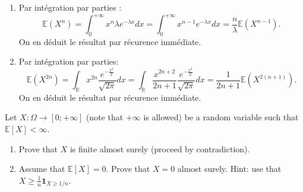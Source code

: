 \begin{solution}
  \begin{enumerate}
    \item Par int\'{e}gration par parties :
          \[
            \mathbb{E}\left(X^{n}\right) = \int_{0}^{+\infty}x^{n}\lambda e^{-\lambda x}dx = \int_{0}^{+\infty}x^{n-1} e^{-\lambda x}dx = \frac{n}{\lambda}\mathbb{E}\left(X^{n-1}\right).
          \]
          On en d\'{e}duit le r\'{e}sultat par r\'{e}curence imm\'{e}diate.
    \item Par int\'{e}gration par parties:
          \[
            \mathbb{E}\left(X^{2n}\right) = \int_{\mathbb{R}}x^{2n}\frac{e^{-\frac{x^2}{2}}}{\sqrt{2\pi}}dx = \int_{\mathbb{R}}\frac{x^{2n+2}}{2n + 1}\frac{e^{-\frac{x^2}{2}}}{\sqrt{2\pi}}dx = \frac{1}{2n+1}\mathbb{E}\left(X^{2(n+1)}\right).
          \]
          On en d\'{e}duit le r\'{e}sultat par r\'{e}curence imm\'{e}diate.
  \end{enumerate}
\end{solution}

\begin{Exercise}
  Let $X: \Omega \rightarrow[0 ;+\infty]$ (note that $+\infty$ is allowed) be a random variable such that $\mathbb{E}[X]<\infty$.

  \begin{enumerate}
    \item Prove that $X$ is finite almost surely (proceed by contradiction).

    \item Assume that $\mathbb{E}[X]=0$. Prove that $X=0$ almost surely. Hint: use that $X \geq \frac{1}{n} \mathbf{1}_{X \geq 1 / n}$.
  \end{enumerate}
\end{Exercise}
